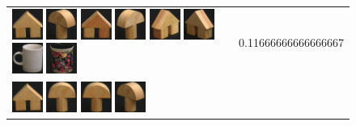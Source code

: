 \begin{figure}[tbp]
\begin{center}
\begin{tabular}{m{11cm} | m{3cm} |}
\includegraphics[width=1cm]{coil/beeld-42.eps} 
\includegraphics[width=1cm]{coil/beeld-4.eps} 
\includegraphics[width=1cm]{coil/beeld-43.eps} 
\includegraphics[width=1cm]{coil/beeld-3.eps} 
\includegraphics[width=1cm]{coil/beeld-45.eps} 
\includegraphics[width=1cm]{coil/beeld-46.eps} 
\includegraphics[width=1cm]{coil/beeld-37.eps} 
\includegraphics[width=1cm]{coil/beeld-62.eps} & {\scriptsize 
0.11666666666666667} \\ \includegraphics[width=1cm]{coil/beeld-42.eps} 
\includegraphics[width=1cm]{coil/beeld-0.eps} 
\includegraphics[width=1cm]{coil/beeld-1.eps} 
\includegraphics[width=1cm]{coil/beeld-4.eps} 

\end{tabular}
\end{center}
\end{figure}
